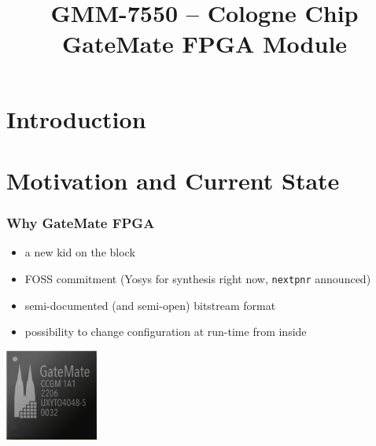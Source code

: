 
\usepackage{tikz}

\title[GMM-7550 Module]{GMM-7550 -- Cologne Chip GateMate FPGA Module}
\subtitle{}




\begin{frame}
  \titlepage
\end{frame}

\section{Introduction}



\frame{\tableofcontents}

\section{Motivation and Current State}

\begin{frame}
  \frametitle{Why GateMate FPGA}

  \begin{itemize}
    \item a new kid on the block
    \item FOSS commitment (Yosys for synthesis right now, \texttt{nextpnr}
    announced)
    \item semi-documented (and semi-open) bitstream format
    \item possibility to change configuration at run-time from inside
  \end{itemize}

  \begin{center}
    \includegraphics[height=3cm]{CCGM1A1_front.jpg}
  \end{center}

\end{frame}

